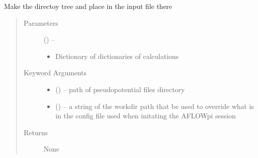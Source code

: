 \documentclass[letterpaper,10pt,english]{sphinxmanual}
\begin{document}
\begin{fulllineitems}
\label{\detokenize{prep:prep.maketree}}
Make the directoy tree and place in the input file there
\begin{quote}\begin{description}
\item[{Parameters}] \leavevmode
{} () -- \begin{itemize}
\item {} 
Dictionary of dictionaries of calculations

\end{itemize}


\item[{Keyword Arguments}] \leavevmode\begin{itemize}
\item {} 
 () -- path of pseudopotential files directory

\item {} 
 () -- a string of the workdir path that be used to override what is in the
config file used when initating the AFLOWpi session

\end{itemize}

\item[{Returns}] \leavevmode
None

\end{description}\end{quote}

\end{fulllineitems}

\end{document}
